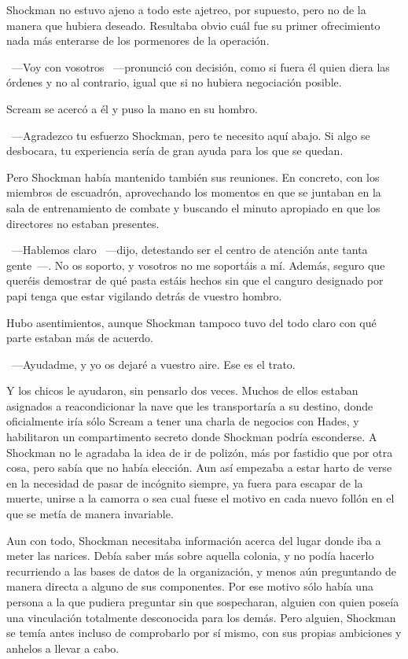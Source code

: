 Shockman no estuvo ajeno a todo este ajetreo, por supuesto, pero no de la manera que hubiera deseado. Resultaba obvio cuál fue su primer ofrecimiento nada más enterarse de los pormenores de la operación.

~---Voy con vosotros ~---pronunció con decisión, como si fuera él quien diera las órdenes y no al contrario, igual que si no hubiera negociación posible.

Scream se acercó a él y puso la mano en su hombro.

~---Agradezco tu esfuerzo Shockman, pero te necesito aquí abajo. Si algo se desbocara, tu experiencia sería de gran ayuda para los que se quedan.

Pero Shockman había mantenido también sus reuniones. En concreto, con los miembros de escuadrón, aprovechando los momentos en que se juntaban en la sala de entrenamiento de combate y buscando el minuto apropiado en que los directores no estaban presentes.

~---Hablemos claro ~---dijo, detestando ser el centro de atención ante tanta gente~---. No os soporto, y vosotros no me soportáis a mí. Además, seguro que queréis demostrar de qué pasta estáis hechos sin que el canguro designado por papi tenga que estar vigilando detrás de vuestro hombro.

Hubo asentimientos, aunque Shockman tampoco tuvo del todo claro con qué parte estaban más de acuerdo.

~---Ayudadme, y yo os dejaré a vuestro aire. Ese es el trato.

Y los chicos le ayudaron, sin pensarlo dos veces. Muchos de ellos estaban asignados a reacondicionar la nave que les transportaría a su destino, donde oficialmente iría sólo Scream a tener una charla de negocios con Hades, y habilitaron un compartimento secreto donde Shockman podría esconderse. A Shockman no le agradaba la idea de ir de polizón, más por fastidio que por otra cosa, pero sabía que no había elección. Aun así empezaba a estar harto de verse en la necesidad de pasar de incógnito siempre, ya fuera para escapar de la muerte, unirse a la camorra o sea cual fuese el motivo en cada nuevo follón en el que se metía de manera invariable.

Aun con todo, Shockman necesitaba información acerca del lugar donde iba a meter las narices. Debía saber más sobre aquella colonia, y no podía hacerlo recurriendo a las bases de datos de la organización, y menos aún preguntando de manera directa a alguno de sus componentes. Por ese motivo sólo había una persona a la que pudiera preguntar sin que sospecharan, alguien con quien poseía una vinculación totalmente desconocida para los demás. Pero alguien, Shockman se temía antes incluso de comprobarlo por sí mismo, con sus propias ambiciones y anhelos a llevar a cabo.

